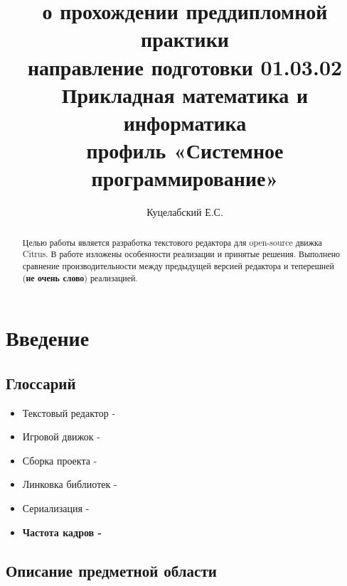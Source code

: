 \documentclass{fefu}
\begin{document}
	\title{о прохождении преддипломной практики\\направление подготовки 01.03.02 
	Прикладная математика и информатика\\профиль «Системное программирование»}
	\author{Куцелабский Е.С.}
	
	\makereporttitle
	\tableofcontents
	\newpage
	
	\begin{abstract}
		\par Целью работы является разработка текстового редактора для 
		open-source движка Citrus. 
		В работе изложены особенности реализации и принятые решения.
		Выполнено сравнение производительности между предыдущей версией редактора и
		теперешней (\textbf{не очень слово}) реализацией.
	\end{abstract}

	\section{Введение}
		\subsection{Глоссарий}
			\begin{itemize}
				\item Текстовый редактор - 
				\item Игровой движок - 
				\item Сборка проекта -
				\item Линковка библиотек -
				\item Сериализация - 
				\item \textbf{Частота кадров -}
			\end{itemize}
		\subsection{Описание предметной области}
\end{document}
